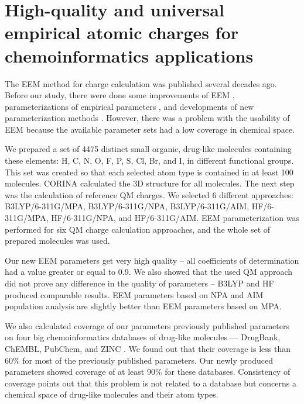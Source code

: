 \section{High-quality and universal empirical atomic charges for
chemoinformatics applications} \label{sec:param-article}

The EEM method for charge calculation was published several decades ago.
Before our study, there were done some improvements of EEM \cite{Yang1997,
Chaves2006}, parameterizations of empirical parameters \cite{Mortier1986, Baekelandt1991, 
Bultinck2002, Bultinck2004, Chaves2006, Svobodova2007, Jirouskova2009, Ouyang2009},
and developments of new parameterization methods \cite{Svobodova2007, Bultinck2002, Chaves2006}.
However, there was a problem with the usability of EEM because the available
parameter sets had a low coverage in chemical space.    

We prepared a set of 4475 distinct small organic, drug-like molecules containing
these elements: H, C, N, O, F, P, S, Cl, Br, and I, in different functional
groups. This set was created so that each selected atom type is contained
in at least 100 molecules. CORINA calculated the 3D structure for all molecules.
The next step was the calculation of reference QM charges. We selected
6 different approaches: B3LYP/6-311G/MPA, B3LYP/6-311G/NPA, B3LYP/6-311G/AIM,
HF/6-311G/MPA, HF/6-311G/NPA, and HF/6-311G/AIM. EEM parameterization was
performed for six QM charge calculation approaches, and the whole
set of prepared molecules was used.

Our new EEM parameters get very high quality -- all coefficients of determination had
a value greater or equal to 0.9. We also showed that the used QM approach did
not prove any difference in the quality of parameters -- B3LYP and HF produced
comparable results. EEM parameters based on NPA and AIM population analysis are
slightly better than EEM parameters based on MPA.

 We also calculated coverage of our parameters previously published parameters
 on four big chemoinformatics databases of drug-like molecules — DrugBank, \cite{Law2014}
 ChEMBL, \cite{Bento2013} PubChem, \cite{pubchem} and ZINC \cite{Irwin2012}.
 We found out that their coverage is less than 60\%
 for most of the previously published parameters.  Our newly produced parameters
 showed coverage of at least 90\% for these databases. Consistency of coverage
 points out that this problem is not related to a database but concerns
 a chemical space of drug-like molecules and their atom types.

